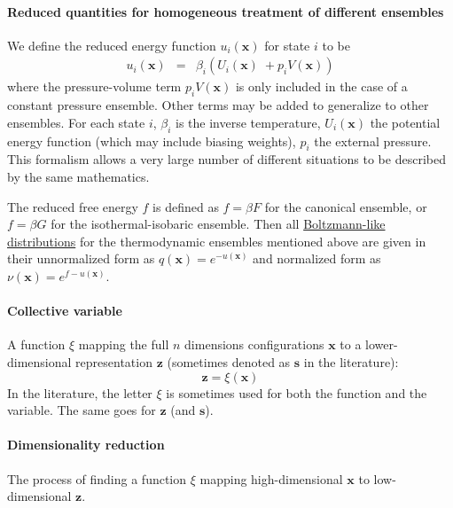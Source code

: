 \documentclass[9pt,review]{livecoms}
\newcommand{\vx}{\mathbf{x}}
\newcommand{\vz}{\mathbf{z}}
\begin{document}
\hypertarget{ref:reduced} {\paragraph{Reduced quantities for homogeneous treatment of different ensembles}}

We define the reduced energy function $u_i(\vx)$
for state $i$ to be
\begin{eqnarray}
u_i(\vx) &=& \beta_i ( U_i(\vx) \;
+ p_i V(\vx)) \label{equation:reduced-energy}
\end{eqnarray}
where the pressure-volume term $p_i V(\vx)$ is only included in the case of a constant pressure ensemble.
Other terms may be added to generalize to other ensembles.
For each state $i$, $\beta_i$ is the inverse temperature, $U_i(\vx)$ the potential energy function (which may include biasing weights), $p_i$ the external pressure.
This formalism allows a very large number of different
situations to be described by the same mathematics.

The reduced free energy $f$ is defined as $f = \beta F$ for the canonical ensemble,
or $f = \beta G$ for the isothermal-isobaric ensemble.
Then all \hyperlink{ref:Distribution} {Boltzmann-like distributions} for the thermodynamic ensembles mentioned above are given in their unnormalized form as $q(\vx) = e^{-u(\vx)}$ and normalized form as
  $\nu(\vx) = e^{f-u(\vx)}$.


\hypertarget{ref:CV}{\paragraph{Collective variable}} A function $\xi$ mapping the full $n$ dimensions configurations $\vx$ to a lower-dimensional representation $\vz$ (sometimes denoted as $\mathbf{s}$ in the literature):
\begin{equation}
\vz = \xi(\vx)
\end{equation}
In the literature, the letter $\xi$ is sometimes used for both the function and the variable. The same goes for $\vz$ (and $\mathbf{s}$).

\hypertarget{ref:DimRed} {\paragraph{Dimensionality reduction}}
The process of finding a function $\xi$ mapping high-dimensional $\vx$ to low-dimensional $\vz$.
\end{document}
